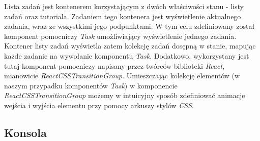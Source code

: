 \documentclass[12pt,a4paper,polish,thesis]{dcsbook}
\begin{document}
{	Lista zadań jest kontenerem korzystającym z dwóch właściwości stanu - listy zadań oraz tutoriala. Zadaniem tego kontenera jest wyświetlenie aktualnego zadania, wraz ze wszystkimi jego podpunktami. W tym celu zdefiniowany został komponent pomocniczy \textit{Task} umożliwiający wyświetlenie jednego zadania. Kontener listy zadań wyświetla zatem kolekcję zadań dosępną w stanie, mapując każde zadanie na wywołanie komponentu \textit{Task}. Dodatkowo, wykorzystany jest tutaj komponent pomocniczy napisany przez twórców biblioteki \textit{React}, mianowicie \textit{ReactCSSTransitionGroup}. Umieszczając kolekcję elementów (w naszym przypadku komponentów \textit{Task}) w komponencie \textit{ReactCSSTransitionGroup} możemy w intuicyjny sposób zdefiniować animacje wejścia i wyjścia elementu przy pomocy arkuszy stylów \textit{CSS}.

	\subsection{Konsola}

}
\end{document}
